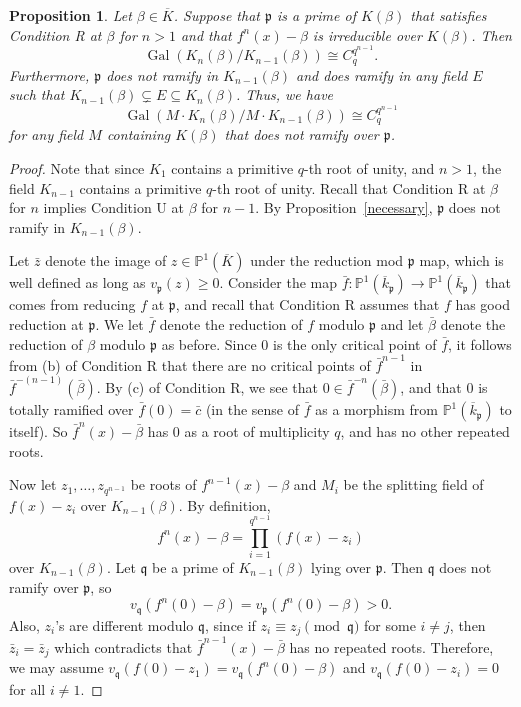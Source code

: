 \documentclass[11pt]{amsart}
\newtheorem{prop}[thm]{Proposition}
\theoremstyle{definition}
\theoremstyle{definition}
\numberwithin{thm}{section}
\numberwithin{equation}{thm}
\renewcommand{\P}{\ensuremath{{\mathbb{P}}}}
\newcommand{\fp}{\ensuremath{{\mathfrak{p}}}}
\newcommand{\fq}{\ensuremath{{\mathfrak{q}}}}
\newcommand{\Kbar}{\ensuremath {\overline K}}
\DeclareMathOperator{\Gal}{Gal}
\begin{document}
\begin{prop}\label{main Galois}
Let $\beta\in\Kbar$. Suppose that $\fp$ is a prime of $K(\beta)$ that 
satisfies Condition R at $\beta$ for $n > 1$ and that $f^n(x)
- \beta$ is irreducible over $K(\beta)$. Then 
\[ \Gal( K_{n}(\beta) / K_{n-1}(\beta)) \cong C_q^{q^{n-1}}.\]
Furthermore, $\fp$
does not ramify in $K_{n-1}(\beta)$ and does ramify in any field $E$ such that
$K_{n-1}(\beta) \subsetneq E \subseteq K_n(\beta)$. Thus, we have
\begin{equation} \label{disj} \Gal( M \cdot K_{n}(\beta) / M \cdot K_{n-1}(\beta)) \cong
  C_q^{q^{n-1}}
\end{equation}
for any field $M$ containing $K(\beta)$ that does not ramify over
$\fp$.  
\end{prop}
\begin{proof}
Note that since $K_1$ contains a primitive $q$-th root of unity, and
$n > 1$, the field $K_{n-1}$ contains a primitive $q$-th root of
unity. 
Recall that Condition R at $\beta$ for $n$ implies Condition U at $\beta$ for $n-1$. 
By Proposition~\ref{necessary}, $\fp$ does not ramify in $K_{n-1}(\beta)$.

Let $\bar{z}$ denote the image of $z\in \P^1(\Kbar)$ under the
reduction mod $\fp$ map, which is well defined as long as
$v_\fp(z)\geq 0$. Consider the map
$\bar{f}:\P^1(\overline{k}_\fp)\to\P^1(\overline{k}_\fp)$ that comes
from reducing $f$ at $\fp$, and recall that Condition R assumes that
$f$ has good reduction at $\fp$.  We let ${\bar f}$ denote the
reduction of $f$ modulo $\fp$ and let ${\bar \beta}$ denote the
reduction of $\beta$ modulo $\fp$ as before.  Since 0 is the only
critical point of ${\bar f}$, it follows from (b) of Condition R that
there are no critical points of ${\bar f}^{n-1}$ in
${\bar f}^{-(n-1)}({\bar \beta})$.  By (c) of Condition R, we see that
$0\in\bar{f}^{-n}(\bar \beta)$, and that $0$ is totally ramified over
$\bar{f}(0)=\bar{c}$ (in the sense of $\bar{f}$ as a morphism from
$\P^1(\overline{k}_\fp)$ to itself).  So $\bar{f}^n(x)-\bar{\beta}$ has $0$ as a
root of multiplicity $q$, and has no other repeated roots.

Now let $z_1,\dots,z_{q^{n-1}}$ be roots of $f^{n-1}(x)-\beta$ and
$M_i$ be the splitting field of $f(x)-z_i$ over $K_{n-1}(\beta)$.
By definition, \[f^n(x)-\beta = \prod_{i=1}^{q^{n-1}} (f(x)-z_i)\]
over $K_{n-1}(\beta)$. Let $\fq$ be a prime of $K_{n-1}(\beta)$
lying over $\fp$. Then $\fq$ does not ramify over $\fp$, so
\[v_\fq (f^n(0)-\beta) = v_\fp (f^n(0)-\beta) >0.\]
Also, $z_i$'s are different modulo $\fq$, since if
$z_i\equiv z_j \pmod \fq$ for some $i\ne j$,
then $\bar z_i = \bar z_j$ which contradicts that
$\bar f^{n-1}(x)-\bar \beta$ has no repeated roots.
Therefore, we may assume
$v_\fq(f(0)-z_1)=v_\fq(f^n(0)-\beta)$ and $v_\fq(f(0)-z_i)=0$
for all $i\ne 1$.


\end{proof}
\end{document}
